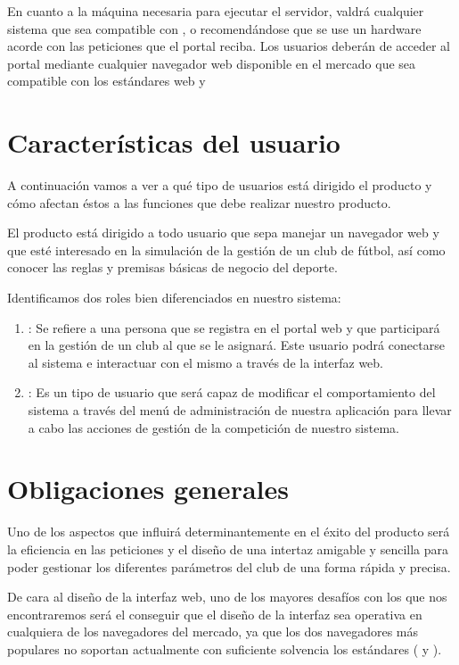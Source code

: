 En cuanto a la máquina necesaria para ejecutar el servidor, valdrá cualquier
sistema que sea compatible con ,  o
 recomendándose que se use un hardware acorde con las
peticiones que el portal reciba. Los usuarios deberán de acceder al portal
mediante cualquier navegador web disponible en el mercado que sea compatible con
los estándares web  y 

\section{Características del usuario}
A continuación vamos a ver a qué tipo de usuarios está dirigido el producto y
cómo afectan éstos a las funciones que debe realizar nuestro producto.

El producto está dirigido a todo usuario que sepa manejar un navegador web y que
esté interesado en la simulación de la gestión de un club de fútbol, así como
conocer las reglas y premisas básicas de negocio del deporte.

Identificamos dos roles bien diferenciados en nuestro sistema:

\begin{enumerate}
\item {}: Se refiere a una persona que se registra en el
  portal web y que participará en la gestión de un club al que se le
  asignará. Este usuario podrá conectarse al sistema e interactuar con el mismo
  a través de la interfaz web.
\item {}: Es un tipo de usuario que será capaz de
  modificar el comportamiento del sistema a través del menú de administración de
  nuestra aplicación para llevar a cabo las acciones de gestión de la
  competición de nuestro sistema.
\end{enumerate}
\section{Obligaciones generales}
Uno de los aspectos que influirá determinantemente en el éxito del producto será
la eficiencia en las peticiones y el diseño de una intertaz amigable y sencilla
para poder gestionar los diferentes parámetros del club de una forma rápida y
precisa.

De cara al diseño de la interfaz web, uno de los mayores desafíos con los que
nos encontraremos será el conseguir que el diseño de la interfaz sea operativa
en cualquiera de los navegadores del mercado, ya que los dos navegadores más
populares no soportan actualmente con suficiente solvencia los estándares
 ( y ).
